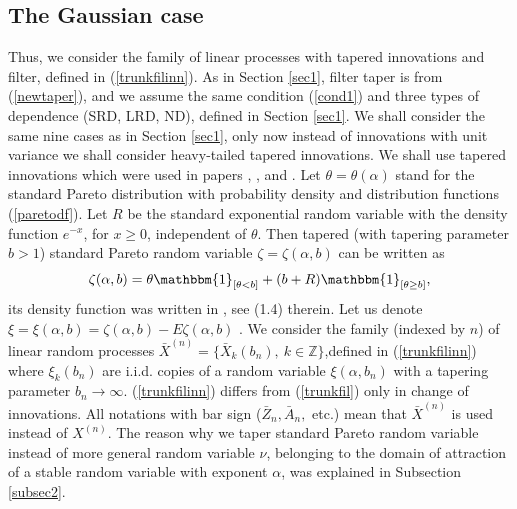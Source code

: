 \documentclass[12pt]{article}
\def\bz{{\bf Z}}
\def\bz{{\mathbb Z}} %
\def\a{\alpha}
\newcommand{\ind}[1]{\mathbbm{1}_{#1}}
\theoremstyle{plain}
\theoremstyle{definition}
\begin{document}
\subsection{The Gaussian case}
 Thus, we consider the family of linear processes with tapered innovations and filter, defined in (\ref{trunkfilinn}). As in Section \ref{sec1}, filter taper is from (\ref{newtaper}), and we assume the same condition (\ref{cond1}) and three types of dependence (SRD, LRD, ND), defined in Section \ref{sec1}. We shall consider the same nine cases  as in Section \ref{sec1}, only now instead of innovations with unit variance we shall consider heavy-tailed tapered innovations. We shall use tapered innovations which  were used in papers \cite{Paul21}, \cite{Paul22}, and \cite{PaulDam5}. Let $\theta =\theta (\a)$ stand for  the standard Pareto distribution with probability density and distribution functions (\ref{paretodf}).
Let  $R$ be the standard exponential random variable with the  density function $e^{-x}$, for $x\ge 0$, independent of $\theta$.
Then  tapered (with tapering parameter $b>1$) standard Pareto random variable $\zeta= \zeta (\a, b)$  can be written as
\begin{equation}\label{tapparetodf}
\zeta (\a, b)=\theta\ind{[\theta<b]}+(b+R)\ind{[\theta\ge b]},
\end{equation}
its density function was written in \cite{Paul22}, see (1.4) therein.
Let us denote $\xi =\xi (\a, b)=\zeta (\a, b)-E\zeta (\a, b)$ . We consider the family (indexed by $n$) of linear random processes ${\bar X}^{(n)}=\{{\bar X}_{k}(b_n),\ k\in \bz \}$,defined in (\ref{trunkfilinn})
where $\xi_{k}(b_n)$ are i.i.d. copies of a random variable $\xi (\a, b_n)$ with a tapering parameter $b_n\to \infty$. (\ref{trunkfilinn}) differs from (\ref{trunkfil})  only in change of innovations. All notations with bar  sign (${\bar Z}_n, {\bar A}_n,$ etc.) mean that ${\bar X}^{(n)}$ is used instead of  $X^{(n)}$.
The reason why we taper standard Pareto random variable instead of more general random variable $\nu$, belonging to the domain of attraction of a stable random variable with exponent $\a$, was explained in Subsection \ref{subsec2}.
\end{document}
